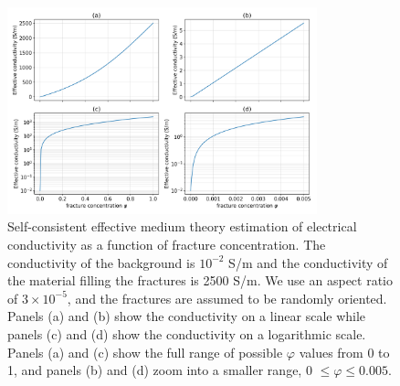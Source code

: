 \begin{figure}
    \begin{center}
    \includegraphics[width=0.8\textwidth]{figures/inversion/scemt_mapping.png}
    \end{center}
\caption{
   Self-consistent effective medium theory estimation of electrical conductivity as a function of fracture concentration.
   The conductivity of the background is $10^{-2}$ S/m and the conductivity of the material filling the fractures is 2500 S/m.
   We use an aspect ratio of $3 \times 10^{-5}$, and the fractures are assumed to be randomly oriented. Panels (a) and (b) show the
   conductivity on a linear scale while panels (c) and (d) show the conductivity on a logarithmic scale. Panels (a) and (c) show the
   full range of possible $\varphi$ values from 0 to 1, and panels (b) and (d) zoom into a smaller range, 0 $\leq \varphi \leq 0.005$.
}
\label{fig:scemt_mapping}
\end{figure}

